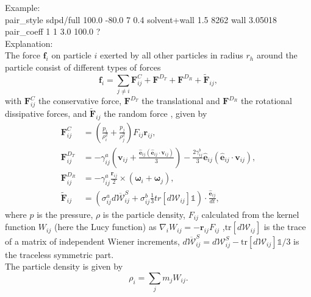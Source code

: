 Example:
\\[0.5ex]
pair\_style      sdpd/full 100.0 -80.0 7 0.4 solvent+wall 1.5 8262 wall 3.05018
\\[1ex]
pair\_coeff      1 1 3.0 100.0 ?
\\[2ex]
Explanation:\\
The force $\mathbf{f}_i$ on particle $i$ exerted by all other particles in radius $r_h$ around the particle 
consist of different types of forces
\begin{equation}
\mathbf{f}_i = \sum_{j \neq i} \mathbf{F}^C_{ij} +\mathbf{F}^{D_T} + \mathbf{F}^{D_R} + \mathbf{ \tilde F}_{ij},
\end{equation}
with  $\mathbf{F}^C_{ij}$ the conservative force, $\mathbf{F}^{D_T}$ the translational and $\mathbf{F}^{D_R}$ the rotational dissipative forces, and $\mathbf{ \tilde F}_{ij}$ the random force , given by
%
\begin{align}\label{eq:sdpd_forces}
\mathbf{F}^C_{ij} &= \left( \frac{p_i}{\rho_i^2} + \frac{p_j}{\rho_j^2} \right) F_{ij} \mathbf{r}_{ij}, \nonumber \\
\mathbf{F}^{D_T}_{ij} &= -  \gamma_{ij}^a \left(  \mathbf{v}_{ij} + \frac{ \hat{\mathbf{e}}_{ij}  \left( \hat{\mathbf{e}}_{ij} \cdot \mathbf{v}_{ij} \right) }{3} \right)   - \frac{ 2 \gamma_{ij}^b }{3} \hat{\mathbf{e}}_{ij} \left( \hat{\mathbf{e}}_{ij} 
 \cdot \mathbf{v}_{ij} \right),  \\ 
\mathbf{F}^{D_R}_{ij} & = - \gamma_{ij}^a\frac{\mathbf{ r}_{ij}}{2}\times \left( {\boldsymbol {\omega}}_i+{\boldsymbol{\omega}}_j \right), \nonumber \\ 
\mathbf{ \tilde F}_{ij} &=  \left(  \sigma_{ij}^{a} d\overline{\boldsymbol{\mathcal{W}}}_{ij}^S + \sigma_{ij}^{b} 
\frac{1}{3}tr[d\boldsymbol{\mathcal{W}}_{ij}] \mathds{1} \right) \cdot \frac{\mathbf{\hat e}_{ij}}{dt}, \nonumber
\end{align}
where $p$ is the pressure, $\rho$ is the particle density, $F_{ij}$ calculated from the kernel function $W_{ij}$ (here the Lucy function) as $\nabla_i W_{ij} = -{\mathbf r}_{ij}F_{ij}$  ,$\text{tr}[d\boldsymbol{\mathcal{ W}}_{ij}]$ is the trace of a matrix of independent Wiener increments, 
$d \overline{\boldsymbol{\mathcal{W}}}^{S}_{ij} = d \boldsymbol{\mathcal{W}}^S_{ij} - \text{tr}[d\boldsymbol{\mathcal{W}}_{ij}]\mathds{1}/3$ is the traceless symmetric part.\\
The particle density is given by
%
\begin{equation}\label{eq:rho}
	\rho_i = \sum_j m_j W_{ij}. 
\end{equation}
